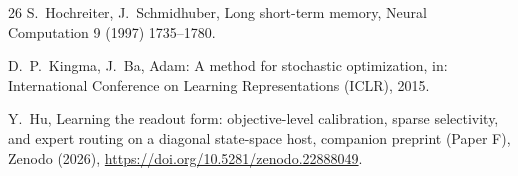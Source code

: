 \documentclass[preprint,12pt]{elsarticle}
\begin{document}
\begin{thebibliography}{26}
S.~Hochreiter, J.~Schmidhuber, Long short-term memory, Neural
Computation 9 (1997) 1735--1780.

D.~P.~Kingma, J.~Ba, Adam: A method for stochastic optimization, in:
International Conference on Learning Representations (ICLR), 2015.

Y.~Hu, Learning the readout form: objective-level calibration, sparse
selectivity, and expert routing on a diagonal state-space host,
companion preprint (Paper F), Zenodo (2026),
\url{https://doi.org/10.5281/zenodo.22888049}.

\end{thebibliography}
\endgroup
\end{document}
